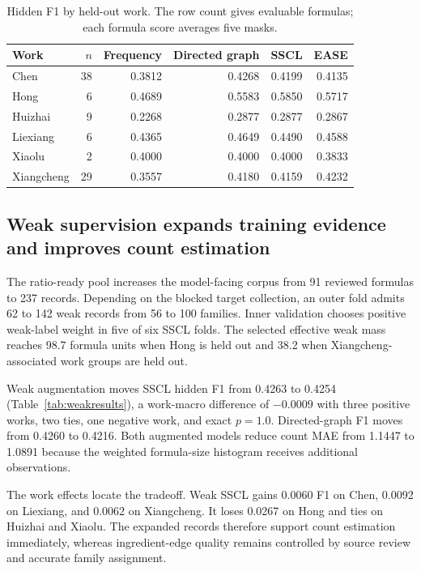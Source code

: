 \documentclass[11pt,a4paper]{article}
\newcommand{\SSCL}{\textsc{SSCL}}
\begin{document}
\begin{table}[t]
\centering
\caption{Hidden F1 by held-out work. The row count gives evaluable formulas; each formula score averages five masks.}
\label{tab:workresults}
\begin{tabular}{lrrrrr}
\toprule
Work & $n$ & Frequency & Directed graph & \SSCL{} & EASE \\
\midrule
Chen & 38 & 0.3812 & 0.4268 & 0.4199 & 0.4135 \\
Hong & 6 & 0.4689 & 0.5583 & 0.5850 & 0.5717 \\
Huizhai & 9 & 0.2268 & 0.2877 & 0.2877 & 0.2867 \\
Liexiang & 6 & 0.4365 & 0.4649 & 0.4490 & 0.4588 \\
Xiaolu & 2 & 0.4000 & 0.4000 & 0.4000 & 0.3833 \\
Xiangcheng & 29 & 0.3557 & 0.4180 & 0.4159 & 0.4232 \\
\bottomrule
\end{tabular}
\end{table}

\subsection{Weak supervision expands training evidence and improves count estimation}

The ratio-ready pool increases the model-facing corpus from 91 reviewed formulas to 237 records. Depending on the blocked target collection, an outer fold admits 62 to 142 weak records from 56 to 100 families. Inner validation chooses positive weak-label weight in five of six \SSCL{} folds. The selected effective weak mass reaches 98.7 formula units when Hong is held out and 38.2 when Xiangcheng-associated work groups are held out.

Weak augmentation moves \SSCL{} hidden F1 from 0.4263 to 0.4254 (Table~\ref{tab:weakresults}), a work-macro difference of $-0.0009$ with three positive works, two ties, one negative work, and exact $p=1.0$. Directed-graph F1 moves from 0.4260 to 0.4216. Both augmented models reduce count MAE from 1.1447 to 1.0891 because the weighted formula-size histogram receives additional observations.

The work effects locate the tradeoff. Weak \SSCL{} gains 0.0060 F1 on Chen, 0.0092 on Liexiang, and 0.0062 on Xiangcheng. It loses 0.0267 on Hong and ties on Huizhai and Xiaolu. The expanded records therefore support count estimation immediately, whereas ingredient-edge quality remains controlled by source review and accurate family assignment.
\end{document}
